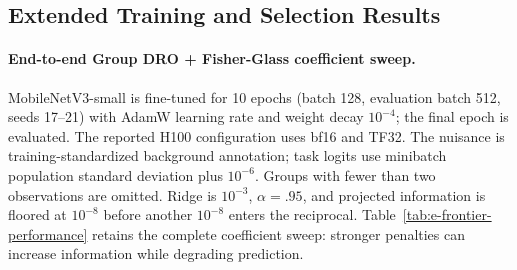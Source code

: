 \subsection{Extended Training and Selection Results}
\label{app:extended-training}

\paragraph{End-to-end Group DRO + Fisher-Glass coefficient sweep.}
MobileNetV3-small is fine-tuned for 10 epochs (batch 128, evaluation batch 512, seeds 17--21) with AdamW learning rate and weight decay $10^{-4}$; the final epoch is evaluated. The reported H100 configuration uses bf16 and TF32. The nuisance is training-standardized background annotation; task logits use minibatch population standard deviation plus $10^{-6}$. Groups with fewer than two observations are omitted. Ridge is $10^{-3}$, $\alpha=.95$, and projected information is floored at $10^{-8}$ before another $10^{-8}$ enters the reciprocal. Table~\ref{tab:e-frontier-performance} retains the complete coefficient sweep: stronger penalties can increase information while degrading prediction.

